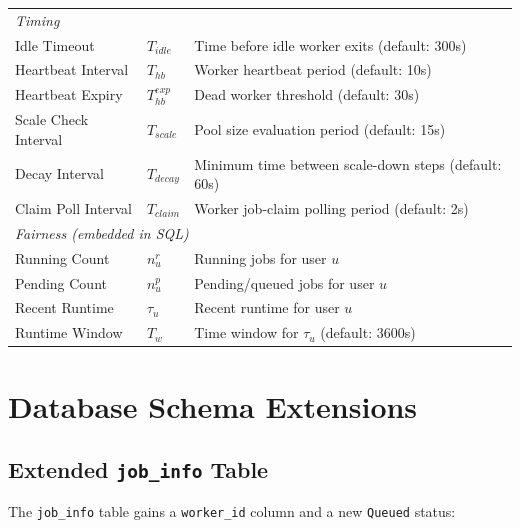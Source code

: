 \documentclass[11pt]{article}
\begin{document}
\begin{center}
\begin{longtable}{p{4cm}p{2.5cm}p{7.5cm}}
    \multicolumn{3}{l}{\textit{Timing}} \\
    Idle Timeout & $T_{idle}$ & Time before idle worker exits (default: 300s) \\
    Heartbeat Interval & $T_{hb}$ & Worker heartbeat period (default: 10s) \\
    Heartbeat Expiry & $T_{hb}^{exp}$ & Dead worker threshold (default: 30s) \\
    Scale Check Interval & $T_{scale}$ & Pool size evaluation period (default: 15s) \\
    Decay Interval & $T_{decay}$ & Minimum time between scale-down steps (default: 60s) \\
    Claim Poll Interval & $T_{claim}$ & Worker job-claim polling period (default: 2s) \\
    \midrule

    \multicolumn{3}{l}{\textit{Fairness (embedded in SQL)}} \\
    Running Count & $n_u^r$ & Running jobs for user $u$ \\
    Pending Count & $n_u^p$ & Pending/queued jobs for user $u$ \\
    Recent Runtime & $\tau_u$ & Recent runtime for user $u$ \\
    Runtime Window & $T_w$ & Time window for $\tau_u$ (default: 3600s) \\

  \end{longtable}
\end{center}


\section{Database Schema Extensions}
\label{sec:db-schema}

\subsection{Extended \texttt{job\_info} Table}

The \texttt{job\_info} table gains a \texttt{worker\_id} column and a new
\texttt{Queued} status:
\end{document}
